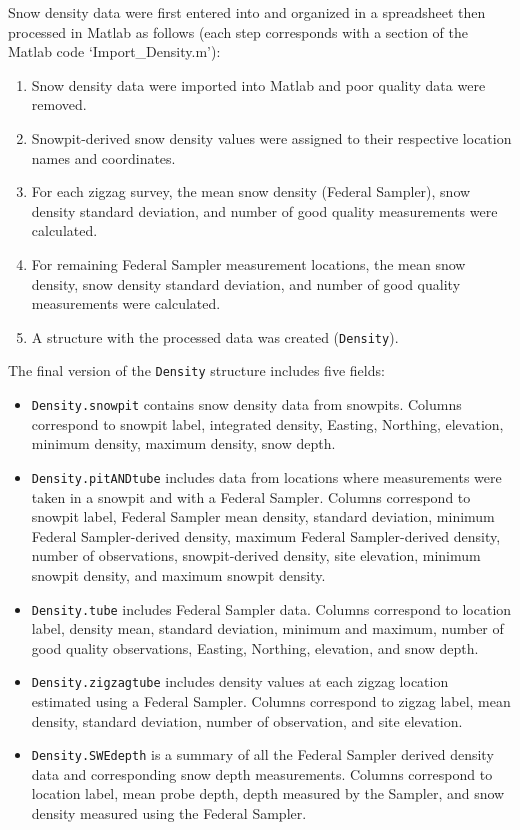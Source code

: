 \documentclass{sfuthesis}
\begin{document}
\begin{appendices}
Snow density data were first entered into and organized in a spreadsheet then processed in Matlab as follows (each step corresponds with a section of the Matlab code `Import\_Density.m'): 
\begin{enumerate}
\item Snow density data were imported into Matlab and poor quality data were removed. 
\item Snowpit-derived snow density values were assigned to their respective location names and coordinates.
\item For each zigzag survey, the mean snow density (Federal Sampler), snow density standard deviation, and number of good quality measurements were calculated.
\item For remaining Federal Sampler measurement locations, the mean snow density, snow density standard deviation, and number of good quality measurements were calculated. 
\item A structure with the processed data was created (\texttt{Density}).
\end{enumerate}

The final version of the \texttt{Density} structure includes five fields:
\begin{itemize}
\item[]\texttt{Density.snowpit} contains snow density data from snowpits. Columns correspond to snowpit label, integrated density, Easting, Northing, elevation, minimum density, maximum density, snow depth.
\item[]\texttt{Density.pitANDtube} includes data from locations where measurements were taken in a snowpit and with a Federal Sampler. Columns correspond to snowpit label, Federal  Sampler mean density, standard deviation, minimum Federal Sampler-derived density, maximum Federal Sampler-derived density, number of observations, snowpit-derived density, site elevation, minimum snowpit density, and maximum snowpit density.
\item[]\texttt{Density.tube} includes Federal Sampler data. Columns correspond to location label, density mean, standard deviation, minimum and maximum, number of good quality observations, Easting, Northing, elevation, and snow depth. 
\item[]\texttt{Density.zigzagtube} includes density values at each zigzag location estimated using a Federal Sampler. Columns correspond to zigzag label, mean density, standard deviation, number of observation, and site elevation. 
\item[]\texttt{Density.SWEdepth} is a summary of all the Federal Sampler derived density data and corresponding snow depth measurements. Columns correspond to location label, mean probe depth, depth measured by the Sampler, and snow density measured using the Federal Sampler. 
\end{itemize}


\end{appendices}
\end{document}
